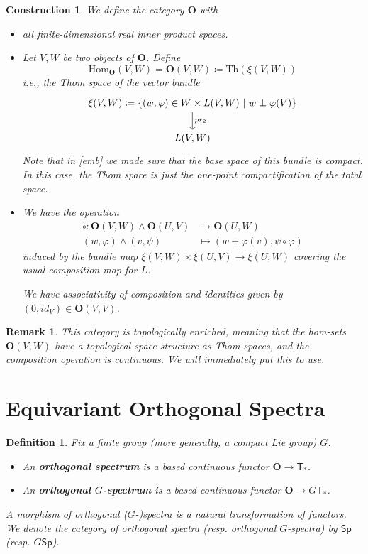 \documentclass{scrartcl}
\newcommand{\textbi}[1]{\textbf{\textit{#1}}}
\newcommand{\bfO}{\mathbf{O}}
\newcommand{\Hom}{\mathrm{Hom}}
\newtheorem{defin}[subsection]{Definition}
\newtheorem{rem}[subsection]{Remark}
\newtheorem{cons}[subsection]{Construction}
\begin{document}
\begin{cons}
    We define the category $\mathbf{O}$ with
    \begin{itemize}
        \item[Objects:] all finite-dimensional real inner product spaces.
        \item[Morphisms:] Let $V,W$ be two objects of $\bfO$. Define $$\Hom_{\bfO}(V,W)= \bfO(V,W)\coloneqq\text{Th}(\xi(V,W))$$ i.e., the Thom space of the vector bundle 
        \[\begin{tikzcd}
            \xi(V,W)\coloneqq \{(w,\varphi)\in W\times L(V,W)\ |\ w\perp\varphi(V)\} \arrow[d, "pr_2"] \\
            L(V,W)
        \end{tikzcd}\]
        Note that in \ref{emb} we made sure that the base space of this bundle is compact. In this case, the Thom space is just the one-point compactification of the total space.
        \item[Composition:] We have the operation 
        \begin{align*}
            \circ: \bfO(V,W)\wedge \bfO(U,V)&\to \bfO(U,W) \\
            (w,\varphi)\wedge (v,\psi) &\mapsto (w+\varphi(v), \psi\circ\varphi)
        \end{align*} induced by the bundle map $\xi(V,W)\times \xi(U,V)\to \xi(U,W)$ covering the usual composition map for $L$.
        \par We have associativity of composition and identities given by $(0, id_V)\in \bfO(V,V)$.
    \end{itemize} 
\end{cons}

\begin{rem}
    This category is topologically enriched, meaning that the hom-sets $\bfO(V,W)$ have a topological space structure as Thom spaces, and the composition operation is continuous. We will immediately put this to use. 
\end{rem}

\section{Equivariant Orthogonal Spectra}

\begin{defin}\label{def}
    Fix a finite group (more generally, a compact Lie group) $G$.
    \begin{itemize}
        \item An \textbi{orthogonal spectrum} is a based continuous functor $\bfO\to \mathsf{T}_*$.
        \item An \textbi{orthogonal $G$-spectrum} is a based continuous functor $\bfO\to G\mathsf{T}_*$. 
    \end{itemize}
    A morphism of orthogonal ($G$-)spectra is a natural transformation of functors. We denote the category of orthogonal spectra (resp. orthogonal $G$-spectra) by $\mathsf{Sp}$ (resp. $G\mathsf{Sp}$).
\end{defin}
\end{document}
